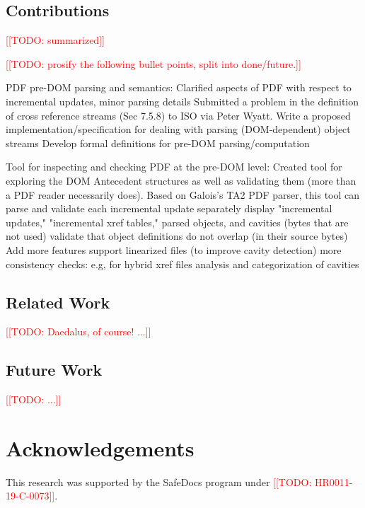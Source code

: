 \documentclass[conference,12pt]{IEEEtran}
\newcommand{\note}[1]{\noteYes{#1}}
\newcommand{\noteYes}[1]{\textcolor{red}{[[#1]]}}
\newcommand{\todo}[1]{\note{TODO: #1}}
\begin{document}
\subsection{Contributions}
\todo{summarized}

\todo{prosify the following bullet points, split into done/future.}

PDF pre-DOM parsing and semantics:
Clarified aspects of PDF with respect to incremental updates, minor parsing details
Submitted a problem in the definition of cross reference streams (Sec 7.5.8) to
ISO via Peter Wyatt.
Write a proposed implementation/specification for dealing with parsing (DOM-dependent) object streams
Develop formal definitions for pre-DOM parsing/computation

Tool for inspecting and checking PDF at the pre-DOM level:
Created tool for exploring the DOM Antecedent structures as well as validating them (more than a PDF reader necessarily does).  Based on Galois's TA2 PDF parser, this tool can
parse and validate each incremental update separately
display "incremental updates," "incremental xref tables," parsed objects, and cavities (bytes that are not used)
validate that object definitions do not overlap (in their source bytes)
Add more features
support linearized files (to improve cavity detection)
more consistency checks: e.g, for hybrid xref files
analysis and categorization of cavities
      
\subsection{Related Work}
\todo{Daedalus, of course! ...}
      
\subsection{Future Work}
\todo{...}


\section*{Acknowledgements}

This research was supported by the SafeDocs program under \todo{HR0011-19-C-0073}.




% 
\end{document}
